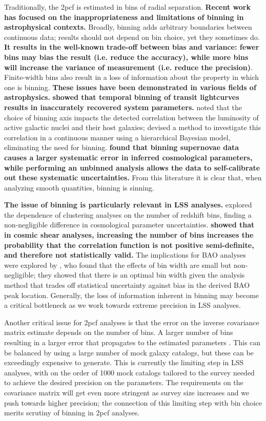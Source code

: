 \documentclass[modern]{aastex62}
\newcommand{\cf}{2pcf\xspace}
\newcommand{\new}[1]{\textbf{#1}}
\begin{document}
Traditionally, the \cf is estimated in bins of radial separation.
\new{Recent work has focused on the inappropriateness and limitations of binning in astrophysical contexts.}
Broadly, binning adds arbitrary boundaries between continuous data; results should not depend on bin choice, yet they sometimes do.
\new{It results in the well-known trade-off between bias and variance: fewer bins may bias the result (i.e. reduce the accuracy), while more bins will increase the variance of measurement (i.e. reduce the precision)}.
Finite-width bins also result in a loss of information about the property in which one is binning.
\new{These issues have been demonstrated in various fields of astrophysics.}
\new{\cite{Kipping2010} showed that temporal binning of transit lightcurves results in inaccurately recovered system parameters.}
\cite{Lanzuisi2017} noted that the choice of binning axis impacts the detected correlation between the luminosity of active galactic nuclei and their host galaxies; \cite{Grimmett2020} devised a method to investigate this correlation in a continuous manner using a hierarchical Bayesian model, eliminating the need for binning.
\new{\cite{Brout2020} found that binning supernovae data causes a larger systematic error in inferred cosmological parameters, while performing an unbinned analysis allows the data to self-calibrate out these systematic uncertainties.}
From this literature it is clear that, when analyzing smooth quantities, binning is sinning.

\new{The issue of binning is particularly relevant in LSS analyses.}
\cite{Bailoni2016} explored the dependence of clustering analyses on the number of redshift bins, finding a non-negligible difference in cosmological parameter uncertainties.
\new{\cite{Schneider2009} showed that in cosmic shear analyses, increasing the number of bins increases the probability that the correlation function is not positive semi-definite, and therefore not statistically valid.}
The implications for BAO analyses were explored by \cite{Percival2014}, who found that the effects of bin width are small but non-negligible; they showed that there is an optimal bin width given the analysis method that trades off statistical uncertainty against bias in the derived BAO peak location.
Generally, the loss of information inherent in binning may become a critical bottleneck as we work towards extreme precision in LSS analyses.

Another critical issue for \cf analyses is that the error on the inverse covariance matrix estimate depends on the number of bins.
A larger number of bins resulting in a larger error that propagates to the estimated parameters \citep{Hartlap2007, Percival2014}.
This can be balanced by using a large number of mock galaxy catalogs, but these can be exceedingly expensive to generate.
This is currently the limiting step in LSS analyses, with on the order of 1000 mock catalogs tailored to the survey needed to achieve the desired precision on the parameters.
The requirements on the covariance matrix will get even more stringent as survey size increases and we push towards higher precision; the connection of this limiting step with bin choice merits scrutiny of binning in \cf analyses.
\end{document}
